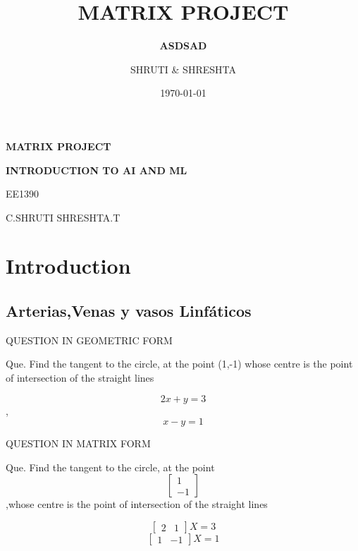 \documentclass[10pt]{beamer}
\title[] %
{ %
      \textbf{MATRIX PROJECT}
}
\subtitle[MATRIX PROJECT]
{
      \textbf{ASDSAD}
}
\author[SHRUTI \& SHRESHTA]
{      SHRUTI \& SHRESHTA \\
      {}
}
\institute[]
{
      Universidad Manuela Beltrán 
      Biomateriales
  
}
\date{\today}
\begin{document}

{\1%



\begin{frame}{\bf MATRIX PROJECT}{}

{\bf INTRODUCTION TO AI AND ML }                 
\newline

EE1390
\newline

\newline
 {\bullet C.SHRUTI}
\newline
    \bullet SHRESHTA.T
\end{frame}

\section{Introduction}
\subsection{Arterias,Venas y vasos Linfáticos}
\begin{frame}{QUESTION IN GEOMETRIC FORM     }

    Que. Find the tangent to the circle, at the point (1,-1)
    whose centre is the point of intersection of the straight lines

    \begin{equation}
        2x+y=3
    \end{equation}
    ,
    \begin{equation}
        x-y=1
    \end{equation}
\end{frame}
\begin{frame}{QUESTION IN MATRIX FORM}

Que. Find the tangent to the circle, at the point 
\[
\begin{bmatrix}
1\\
-1
\end{bmatrix}

\]
,whose centre is the point of intersection of the straight lines

\[
\begin{bmatrix}
2 & 1
\end{bmatrix}
X=3
\]
\[
\begin{bmatrix}
1 & -1
\end{bmatrix}
X=1
\]


\end{frame}}
\end{document}
